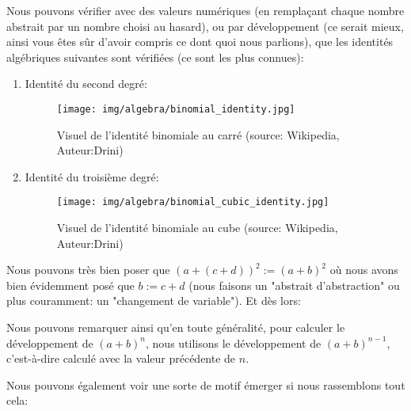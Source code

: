 	\pagebreak
	Nous pouvons vérifier avec des valeurs numériques (en remplaçant chaque nombre abstrait par un nombre choisi au hasard), ou par développement (ce serait mieux, ainsi vous êtes sûr d'avoir compris ce dont quoi nous parlions), que les identités algébriques suivantes sont vérifiées (ce sont les plus connues):
	\begin{enumerate}
		\item Identité du second degré:
		
		\begin{figure}[H]
			\centering
			\texttt{[image: img/algebra/binomial\_identity.jpg]}
			\caption[]{Visuel de l'identité binomiale au carré (source: Wikipedia, Auteur:Drini)}
		\end{figure}
	
		\item Identité du troisième degré:
		
		\begin{figure}[H]
			\centering
			\texttt{[image: img/algebra/binomial\_cubic\_identity.jpg]}
			\caption[]{Visuel de l'identité binomiale au cube (source: Wikipedia, Auteur:Drini)}
		\end{figure}
	\end{enumerate}
	\begin{tcolorbox}[title=Remarque,colframe=black,arc=10pt]
	Nous pouvons très bien poser que $(a+(c+d))^2:=(a+b)^2$ où nous avons bien évidemment posé que  $b:=c+d$ (nous faisons un "abstrait d'abstraction" ou plus couramment: un "changement de variable"). Et dès lors:
	
	\end{tcolorbox}
	Nous pouvons remarquer ainsi qu'en toute généralité, pour calculer le développement de $(a+b)^n$,  nous utilisons le développement de $(a+b)^{n-1}$,  c'est-à-dire calculé avec la valeur précédente de $n$.
	
	Nous pouvons également voir une sorte de motif émerger si nous rassemblons tout cela:
	
